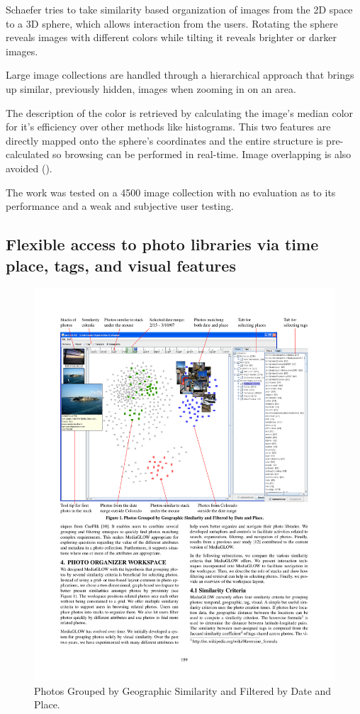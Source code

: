 Schaefer \cite{Schaefer:2010p1871} tries to take similarity based organization of images from the 2D space to a 3D sphere, which allows interaction from the users. Rotating the sphere reveals images with different colors while tilting it reveals brighter or darker images.

Large image collections are handled through a hierarchical approach that brings up similar, previously hidden, images when zooming in on an area.

The description of the color is retrieved by calculating the image's median color for it's efficiency over other methods like histograms. This two features are directly mapped onto the sphere's coordinates and the entire structure is pre-calculated so browsing can be performed in real-time. Image overlapping is also avoided ().

The work was tested on a 4500 image collection with no evaluation as to its performance and a weak and subjective user testing.



\subsection{Flexible access to photo libraries via time place, tags, and visual features} %
\label{sub:Girgensohn}
\begin{figure}[ht]
	\centering
		\includegraphics[width=\textwidth]{imgs-RelatedWork/Girgensohn1.pdf}
	\caption{Photos Grouped by Geographic Similarity and Filtered by Date and Place.}
	\label{fig:girgensohn}
\end{figure}

